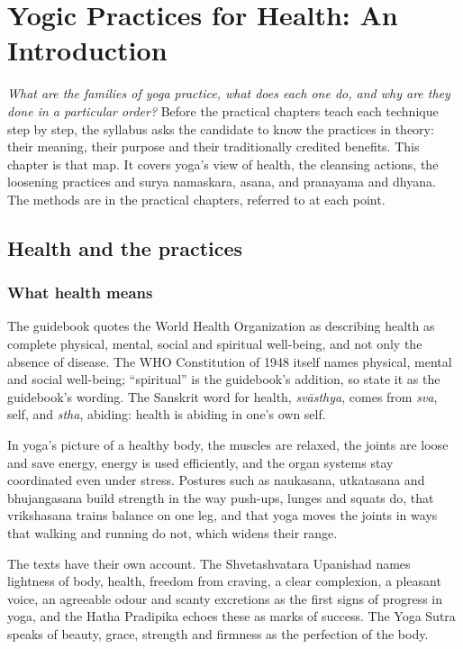 \chapter{Yogic Practices for Health: An Introduction}
\label{ch:practices-intro}

\emph{What are the families of yoga practice, what does each one do, and why are they done in a particular order?}
Before the practical chapters teach each technique step by step, the syllabus asks the candidate to know the practices in theory: their meaning, their purpose and their traditionally credited benefits. This chapter is that map. It covers yoga's view of health, the cleansing actions, the loosening practices and surya namaskara, asana, and pranayama and dhyana. The methods are in the practical chapters, referred to at each point.

\section{Health and the practices}

\subsection*{What health means}
The guidebook quotes the World Health Organization as describing health as complete physical, mental, social and spiritual well-being, and not only the absence of disease. The WHO Constitution of 1948 itself names physical, mental and social well-being; ``spiritual'' is the guidebook's addition, so state it as the guidebook's wording. The Sanskrit word for health, \emph{svāsthya}, comes from \emph{sva}, self, and \emph{stha}, abiding: health is abiding in one's own self.

In yoga's picture of a healthy body, the muscles are relaxed, the joints are loose and save energy, energy is used efficiently, and the organ systems stay coordinated even under stress. Postures such as naukasana, utkatasana and bhujangasana build strength in the way push-ups, lunges and squats do, that vrikshasana trains balance on one leg, and that yoga moves the joints in ways that walking and running do not, which widens their range.

The texts have their own account. The Shvetashvatara Upanishad names lightness of body, health, freedom from craving, a clear complexion, a pleasant voice, an agreeable odour and scanty excretions as the first signs of progress in yoga, and the Hatha Pradipika echoes these as marks of success. The Yoga Sutra speaks of beauty, grace, strength and firmness as the perfection of the body.


